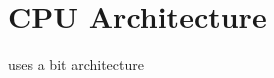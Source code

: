 \section{CPU Architecture}
\label{sec:CPU-Architecture}

\simulator{} uses a \bitWidth{} bit architecture
